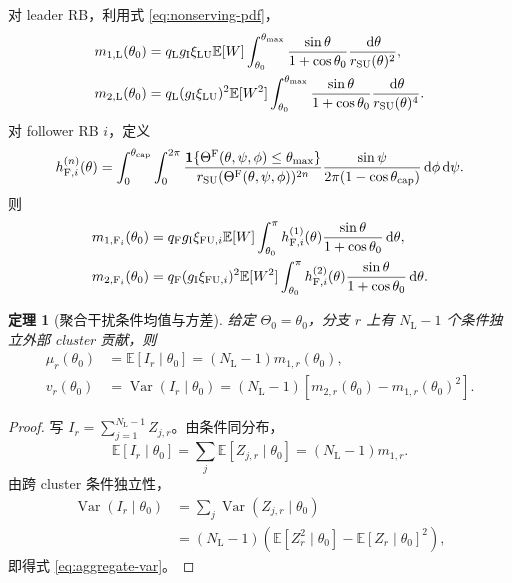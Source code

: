 \documentclass[UTF8,a4paper,11pt]{ctexart}
\newtheorem{theorem}{定理}[section]
\newcommand{\E}{\mathbb E}
\newcommand{\Var}{\operatorname{Var}}
\newcommand{\dd}{\,\mathrm d}
\newcommand{\ind}{\mathbf 1}
\newcommand{\NL}{N_{\mathrm L}}
\newcommand{\thetam}{\theta_{\max}}
\newcommand{\thetac}{\theta_{\mathrm{cap}}}
\begin{document}
对 leader RB，利用式 \eqref{eq:nonserving-pdf}，
\begin{align}
 m_{1,\rm L}(\theta_0)
 &=
 q_{\rm L}g_{\rm I}\xi_{\rm LU}\E[W]
 \int_{\theta_0}^{\thetam}
 \frac{\sin\theta}{1+\cos\theta_0}
 \frac{\dd\theta}{r_{\rm SU}(\theta)^2},
 \label{eq:m1-leader}\\
 m_{2,\rm L}(\theta_0)
 &=
 q_{\rm L}(g_{\rm I}\xi_{\rm LU})^2\E[W^2]
 \int_{\theta_0}^{\thetam}
 \frac{\sin\theta}{1+\cos\theta_0}
 \frac{\dd\theta}{r_{\rm SU}(\theta)^4}.
 \label{eq:m2-leader}
\end{align}
对 follower RB $i$，定义
\begin{equation}
 h_{{\rm F},i}^{(n)}(\theta)
 =
 \int_0^{\thetac}\int_0^{2\pi}
 \frac{
 \ind\{\Theta^{\rm F}(\theta,\psi,\phi)\leq\thetam\}
 }{
 r_{\rm SU}(\Theta^{\rm F}(\theta,\psi,\phi))^{2n}
 }
 \frac{\sin\psi}{2\pi(1-\cos\thetac)}
 \dd\phi\dd\psi.
 \label{eq:follower-distance-moment-kernel}
\end{equation}
则
\begin{align}
 m_{1,{\rm F}_i}(\theta_0)
 &=
 q_{\rm F}g_{\rm I}\xi_{{\rm FU},i}\E[W]
 \int_{\theta_0}^{\pi}
 h_{{\rm F},i}^{(1)}(\theta)
 \frac{\sin\theta}{1+\cos\theta_0}\dd\theta,
 \label{eq:m1-follower}\\
 m_{2,{\rm F}_i}(\theta_0)
 &=
 q_{\rm F}(g_{\rm I}\xi_{{\rm FU},i})^2\E[W^2]
 \int_{\theta_0}^{\pi}
 h_{{\rm F},i}^{(2)}(\theta)
 \frac{\sin\theta}{1+\cos\theta_0}\dd\theta.
 \label{eq:m2-follower}
\end{align}

\begin{theorem}[聚合干扰条件均值与方差]
给定 $\Theta_0=\theta_0$，分支 $r$ 上有 $\NL-1$ 个条件独立外部 cluster 贡献，则
\begin{align}
 \mu_r(\theta_0)
 &=\E[I_r\mid\theta_0]
 =(\NL-1)m_{1,r}(\theta_0),\label{eq:aggregate-mean}\\
 v_r(\theta_0)
 &=\Var(I_r\mid\theta_0)
 =(\NL-1)\left[m_{2,r}(\theta_0)-m_{1,r}(\theta_0)^2\right].
 \label{eq:aggregate-var}
\end{align}
\end{theorem}

\begin{proof}
写 $I_r=\sum_{j=1}^{\NL-1}Z_{j,r}$。由条件同分布，
\begin{equation}
 \E[I_r\mid\theta_0]
 =\sum_j\E[Z_{j,r}\mid\theta_0]
 =(\NL-1)m_{1,r}.
\end{equation}
由跨 cluster 条件独立性，
\begin{equation}
\begin{split}
 \Var(I_r\mid\theta_0)
 &=\sum_j\Var(Z_{j,r}\mid\theta_0)\\
 &=(\NL-1)
 \left(\E[Z_r^2\mid\theta_0]-\E[Z_r\mid\theta_0]^2\right),
\end{split}
\end{equation}
即得式 \eqref{eq:aggregate-var}。
\end{proof}
\end{document}
